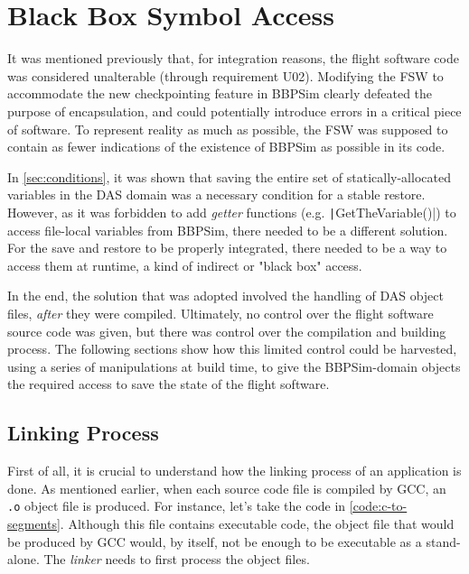 {
\setlength{\parindent}{2em}
\section{Black Box Symbol Access}\label{sec:das-mem-restore}
It was mentioned previously that, for integration reasons, the flight software code was considered unalterable (through requirement U02). Modifying the \gls{FSW} to accommodate the new checkpointing feature in BBPSim clearly defeated the purpose of encapsulation, and could potentially introduce errors in a critical piece of software. To represent reality as much as possible, the FSW was supposed to contain as fewer indications of the existence of \gls{BBPSim} as possible in its code.

In \autoref{sec:conditions}, it was shown that saving the entire set of statically-allocated variables in the DAS domain was a necessary condition for a stable restore. However, as it was forbidden to add \textit{getter} functions (e.g. \texttt|GetTheVariable()|) to access file-local variables from BBPSim, there needed to be a different solution. For the save and restore to be properly integrated, there needed to be a way to access them at runtime, a kind of indirect or "black box" access. 

In the end, the solution that was adopted involved the handling of DAS object files, \textit{after} they were compiled. Ultimately, no control over the flight software source code was given, but there was control over the compilation and building process. The following sections show how this limited control could be harvested, using a series of manipulations at build time, to give the \gls{BBPSim}-domain objects the required access to save the state of the flight software.

\subsection*{Linking Process}
First of all, it is crucial to understand how the linking process of an application is done. As mentioned earlier, when each source code file is compiled by \gls{GCC}, an \texttt{.o} object file is produced. For instance, let's take the code in \autoref{code:c-to-segments}. Although this file contains executable code, the object file that would be produced by GCC would, by itself, not be enough to be executable as a stand-alone. The \textit{linker} needs to first process the object files.

}
